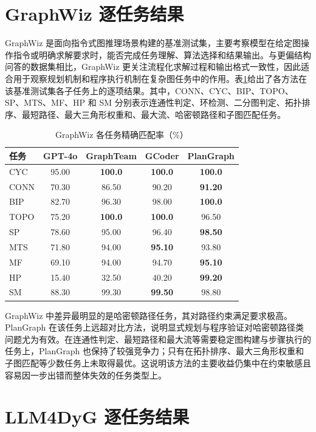\section{GraphWiz 逐任务结果}

GraphWiz 是面向指令式图推理场景构建的基准测试集，主要考察模型在给定图操作指令或明确求解要求时，能否完成任务理解、算法选择和结果输出\cite{gong2024graphwiz}。与更偏结构问答的数据集相比，GraphWiz 更关注流程化求解过程和输出格式一致性，因此适合用于观察规划机制和程序执行机制在复杂图任务中的作用。表\ref{tab:appendix_graphwiz}给出了各方法在该基准测试集各子任务上的逐项结果。其中，CONN、CYC、BIP、TOPO、SP、MTS、MF、HP 和 SM 分别表示连通性判定、环检测、二分图判定、拓扑排序、最短路径、最大三角形权重和、最大流、哈密顿路径和子图匹配任务。

\begin{table}[H]
\centering
\caption{GraphWiz 各任务精确匹配率（\%）}
\label{tab:appendix_graphwiz}
\begin{tabular}{lcccc}
\toprule
任务 & GPT-4o & GraphTeam & GCoder & PlanGraph \\
\midrule
CYC & 95.00 & \textbf{100.0} & \textbf{100.0} & \textbf{100.0} \\
CONN & 70.30 & 86.50 & 90.20 & \textbf{91.20} \\
BIP & 82.70 & 96.30 & 98.00 & \textbf{100.0} \\
TOPO & 75.20 & \textbf{100.0} & \textbf{100.0} & 96.50 \\
SP & 78.60 & 95.00 & 96.40 & \textbf{98.50} \\
MTS & 71.80 & 94.00 & \textbf{95.10} & 93.80 \\
MF & 69.10 & 94.00 & 94.70 & \textbf{95.10} \\
HP & 15.40 & 32.50 & 40.20 & \textbf{99.20} \\
SM & 88.30 & 99.30 & \textbf{99.50} & 98.80 \\
\bottomrule
\end{tabular}
\end{table}

GraphWiz 中差异最明显的是哈密顿路径任务，其对路径约束满足要求极高。PlanGraph 在该任务上远超对比方法，说明显式规划与程序验证对哈密顿路径类问题尤为有效。在连通性判定、最短路径和最大流等需要稳定图构建与步骤执行的任务上，PlanGraph 也保持了较强竞争力；只有在拓扑排序、最大三角形权重和子图匹配等少数任务上未取得最优。这说明该方法的主要收益仍集中在约束敏感且容易因一步出错而整体失效的任务类型上。

\section{LLM4DyG 逐任务结果}


